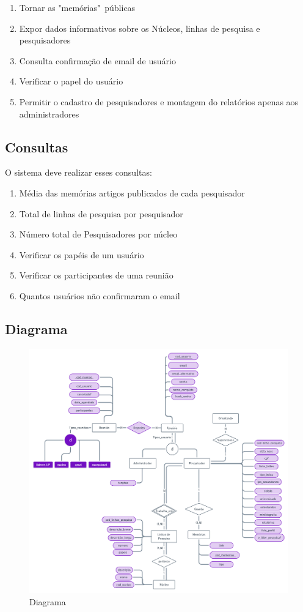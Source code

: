 \documentclass[11pt]{../../classes/ifscarticle}
\begin{document}
\begin{enumerate}
    \item Tornar as "memórias"\ públicas
    \item Expor dados informativos sobre os Núcleos, linhas de pesquisa e pesquisadores
    \item Consulta confirmação de email de usuário
    \item Verificar o papel do usuário
    \item Permitir o cadastro de pesquisadores e montagem do relatórios apenas aos administradores
\end{enumerate}

\subsection{Consultas}


O sistema deve realizar esses consultas:
\begin{enumerate}
    
    \item Média das memórias artigos publicados de cada pesquisador
    \item Total de linhas de pesquisa por pesquisador
    \item Número total de Pesquisadores por núcleo
    \item Verificar os papéis de um usuário 
    \item Verificar os participantes de uma reunião
    \item Quantos usuários não confirmaram o email
\end{enumerate}


\clearpage
\subsection{Diagrama}
\begin{figure}[h]
    \centering
    \includegraphics[width=17cm]{figuras/Diagrama2.png}
    \caption{Diagrama}
    \label{fig:logolatex}
\end{figure}
\clearpage
\end{document}
